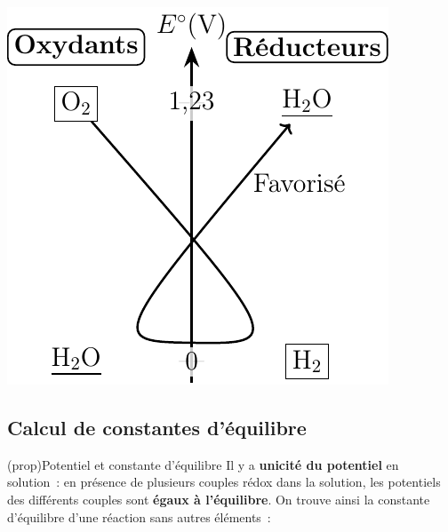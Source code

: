 \documentclass[../../main/main.tex]{subfiles}
\begin{document}
\begin{tcb*}
\begin{isd}
\begin{center}
{			}{
				\includegraphics[width=.6\linewidth]{estand_mediamut-h2o}
			}
		\end{center}
	\end{isd}
\end{tcb*}

\subsection{Calcul de constantes d'équilibre}
\begin{tcb*}(prop){Potentiel et constante d'équilibre}
	Il y a \textbf{unicité du potentiel} en solution~: en présence de plusieurs
	couples rédox dans la solution, les potentiels des différents couples
	sont \textbf{égaux à l'équilibre}. On trouve ainsi la constante d'équilibre d'une
	réaction sans autres éléments~:
	\vspace{-15pt}
\end{tcb*}
\end{document}
